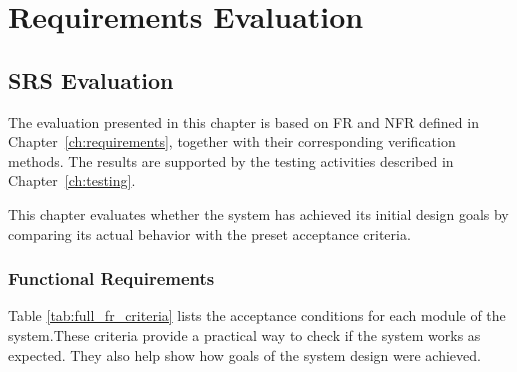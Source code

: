 \chapter{Requirements Evaluation}
\label{ch:evaluation}
\section{SRS Evaluation}
The evaluation presented in this chapter is based on FR and NFR defined in Chapter~\ref{ch:requirements}, together with their corresponding verification methods. The results are supported by the testing activities described in Chapter~\ref{ch:testing}.

This chapter evaluates whether the system has achieved its initial design goals by comparing its actual behavior with the preset acceptance criteria.

\subsection{Functional Requirements}
Table \ref{tab:full_fr_criteria} lists the acceptance conditions for each module of the system.These criteria provide a practical way to check if the system works as expected. They also help show how goals of the system design were achieved.

